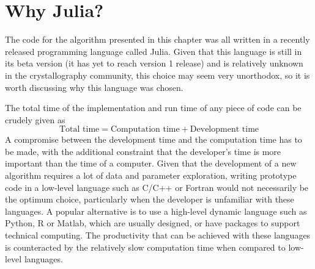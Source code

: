 \section{Why Julia?}
\label{sec:Why Julia?}
The code for the algorithm presented in this chapter was all written in a recently released programming language called Julia.
Given that this language is still in its beta version (it has yet to reach version 1 release) and is relatively unknown in the crystallography community, this choice may seem very unorthodox, so it is worth discussing why this language was chosen.

The total time of the implementation and run time of any piece of code can be crudely given as
\begin{equation*}
    \text{Total time} = \text{Computation time} + \text{Development time}
\end{equation*}
A compromise between the development time and the computation time has to be made, with the additional constraint that the developer's time is more important than the time of a computer.
Given that the development of a new algorithm requires a lot of data and parameter exploration, writing prototype code in a low-level language such as C/C++ or Fortran would not necessarily be the optimum choice, particularly when the developer is unfamiliar with these languages.
A popular alternative is to use a high-level dynamic language such as Python, R or Matlab, which are usually designed, or have packages to support technical computing.
The productivity that can be achieved with these languages is counteracted by the relatively slow computation time when compared to low-level languages.

